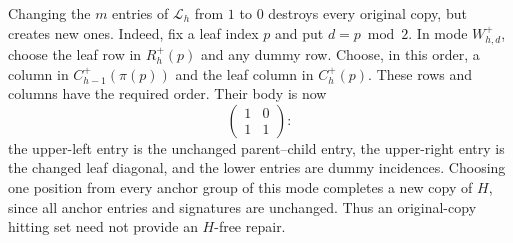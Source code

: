 \begin{remark}\label{rem:hitting-not-repair}
Changing the $m$ entries of $\mathcal L_h$ from $1$ to $0$ destroys every
original copy, but creates new ones. Indeed, fix a leaf index $p$ and put
$d=p\bmod 2$. In mode $W_{h,d}^+$, choose the leaf row in $R_h^+(p)$
and any dummy row. Choose, in this order, a column in
$C_{h-1}^+(\pi(p))$ and the leaf column in $C_h^+(p)$.
These rows and columns have the required order. Their body is now
\[
 \begin{pmatrix}1&0\\1&1\end{pmatrix}:
\]
the upper-left entry is the unchanged parent--child entry, the
upper-right entry is the changed leaf diagonal, and the lower entries
are dummy incidences. Choosing one position from every anchor group
of this mode completes a new copy of $H$, since all anchor entries and
signatures are unchanged. Thus an original-copy hitting set need not
provide an $H$-free repair.
\end{remark}
